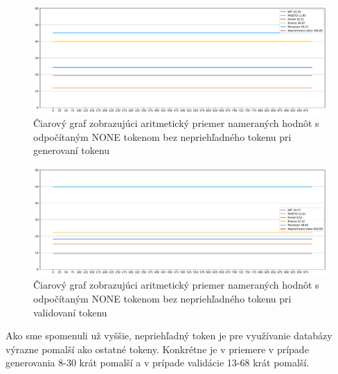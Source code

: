 \begin{figure}[H]
  \centerline{\includegraphics[width=1\textwidth]{images/signin_line_avg_without_opaque}}
  \caption[Čiarový graf -- generovanie, konštantný priemer]{Čiarový graf zobrazujúci aritmetický priemer nameraných hodnôt s odpočítaným NONE tokenom bez nepriehľadného tokenu pri generovaní tokenu}
  \label{fig:signin_line_avg_without_opaque}
\end{figure}

\begin{figure}[H]
  \centerline{\includegraphics[width=1\textwidth]{images/request_line_avg_without_opaque}}
  \caption[Čiarový graf -- validácia, konštantný priemer]{Čiarový graf zobrazujúci aritmetický priemer nameraných hodnôt s odpočítaným NONE tokenom bez nepriehľadného tokenu pri validovaní tokenu}
  \label{fig:request_line_avg_without_opaque}
\end{figure}

Ako sme spomenuli už vyššie, nepriehľadný token je pre využívanie databázy výrazne pomalší ako ostatné tokeny. Konkrétne je v priemere v prípade generovania 8-30 krát pomalší a v prípade validácie 13-68 krát pomalší.

